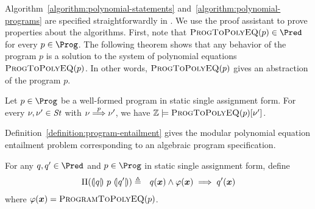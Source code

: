 Algorithm~\ref{algorithm:polynomial-statements}
and~\ref{algorithm:polynomial-programs} are specified straightforwardly 
in \gallina. We use the proof assistant \coq to prove properties
about the algorithms. First, note that $\textsc{ProgToPolyEQ}(p) \in
\Pred$ for every $p \in \Prog$. The following theorem shows that any
behavior of the program $p$ is a solution to the system of polynomial
equations $\textsc{ProgToPolyEQ}(p)$. In other words,
$\textsc{ProgToPolyEQ}(p)$ gives an abstraction of the program $p$.

\begin{theorem}
  Let $p \in \Prog$ be a well-formed program in static single assignment
  form. For every $\nu, \nu' \in \mathit{St}$ with $\nu \overset{p}{\Longrightarrow} \nu'$, 
  we have $\mathbb{Z} \models \textsc{ProgToPolyEQ}(p) [\nu']$.
\end{theorem}

Definition~\ref{definition:program-entailment} gives the modular
polynomial equation entailment problem corresponding to an algebraic
program specification.
\begin{definition}
  For any $q, q' \in \Pred$ and $p \in \Prog$ in static single assignment
  form, define
  \begin{eqnarray*}
    \Pi(\hoaretriple{q}{p}{q'}) & \defn &
    q(\vx) \wedge \varphi(\vx) \implies q'(\vx)
  \end{eqnarray*}
  where $\varphi(\vx) =
  \textsc{ProgramToPolyEQ}(p)$. 
  \label{definition:program-entailment}
\end{definition}

